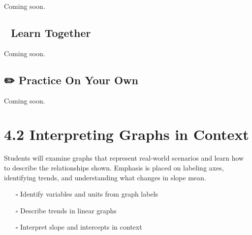 \documentclass[
  letterpaper,
  DIV=11,
  numbers=noendperiod]{scrreprt}
\providecommand{\tightlist}{%
  \setlength{\itemsep}{0pt}\setlength{\parskip}{0pt}}
\begin{document}

Coming soon.

\section*{🧠 Learn Together}\label{learn-together-19}


Coming soon.

\section*{✏️ Practice On Your Own}\label{practice-on-your-own-19}


Coming soon.

\chapter*{4.2 Interpreting Graphs in
Context}\label{interpreting-graphs-in-context-1}


Students will examine graphs that represent real-world scenarios and
learn how to describe the relationships shown. Emphasis is placed on
labeling axes, identifying trends, and understanding what changes in
slope mean.

\begin{tcolorbox}[enhanced jigsaw, left=2mm, opacityback=0, colback=white, rightrule=.15mm, toptitle=1mm, colframe=quarto-callout-note-color-frame, leftrule=.75mm, toprule=.15mm, breakable, bottomtitle=1mm, bottomrule=.15mm, colbacktitle=quarto-callout-note-color!10!white, arc=.35mm, opacitybacktitle=0.6, titlerule=0mm, coltitle=black, title={🎯 Objectives}]

\begin{itemize}
\tightlist
\item[$\square$]
  Identify variables and units from graph labels
\item[$\square$]
  Describe trends in linear graphs
\item[$\square$]
  Interpret slope and intercepts in context
\end{itemize}

\end{tcolorbox}
\end{document}
